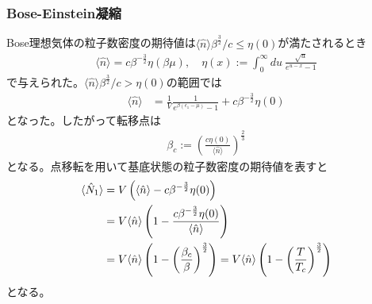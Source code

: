 \documentclass[dvipdfmx, 11pt, a4paper]{jsarticle}
\theoremstyle{definition}
\begin{document}
\subsubsection{Bose-Einstein凝縮}
    Bose理想気体の粒子数密度の期待値は$\langle \hat{n} \rangle \beta^{\frac{3}{2}} / c\le \eta (0)$が満たされるとき
    \begin{align}
        \langle \hat{n} \rangle = c \beta^{-\frac{3}{2}} \eta (\beta \mu), \quad \eta (x) := \int_0^{\infty} du\ \frac{\sqrt{u}}{e^{u - x} - 1}
    \end{align}
    で与えられた。$\langle \hat{n} \rangle \beta^{\frac{3}{2}} / c> \eta (0)$の範囲では
    \begin{align}
        \langle \hat{n} \rangle &= \frac{1}{V} \frac{1}{e^{\beta (\epsilon_1 - \mu)} - 1} + c \beta^{-\frac{3}{2}} \eta (0)
    \end{align}
    となった。したがって転移点は
    \begin{align}
        \beta_c := \left( \frac{c \eta (0)}{\langle \hat{n} \rangle } \right)^{\frac{2}{3}}
    \end{align}
    となる。点移転を用いて基底状態の粒子数密度の期待値を表すと
    \begin{align}
        \langle \hat{N}_1 \rangle &= V \left( \langle \hat{n} \rangle - c \beta^{-\frac{3}{2}} \eta (0) \right) \notag \\
        &= V \langle \hat{n} \rangle \left( 1 - \frac{c \beta^{-\frac{3}{2}} \eta (0)}{\langle \hat{n} \rangle} \right) \notag \\
        &= V \langle \hat{n} \rangle \left( 1 - \left( \frac{\beta_c}{\beta} \right)^{\frac{3}{2}} \right) = V \langle \hat{n} \rangle \left( 1 - \left( \frac{T}{T_c} \right)^{\frac{3}{2}} \right) 
    \end{align}
    となる。
\end{document}
